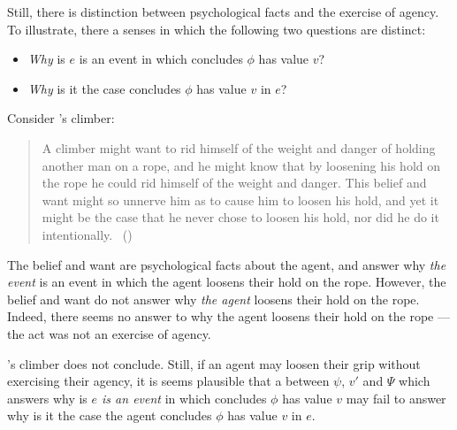 
\begin{note}
  Still, there is distinction between psychological facts and the exercise of agency.
  To illustrate, there a senses in which the following two questions are distinct:

  \begin{itemize}
  \item
    \emph{Why} is \(e\) is an event in which \vAgent{} concludes \(\phi\) has value \(v\)?
  \item
    \emph{Why} is it the case \vAgent{} concludes \(\phi\) has value \(v\) in \(e\)?
  \end{itemize}

  Consider \citeauthor{Davidson:1973vd}'s climber:

  \begin{quote}
    A climber might want to rid himself of the weight and danger of holding another man on a rope, and he might know that by loosening his hold on the rope he could rid himself of the weight and danger.
    This belief and want might so unnerve him as to cause him to loosen his hold, and yet it might be the case that he never chose to loosen his hold, nor did he do it intentionally.%
    \mbox{ }\hfill\mbox{(\citeauthor[79]{Davidson:1973vd})}
  \end{quote}

  The \agents{} belief and want are psychological facts about the agent, and answer why \emph{the event} is an event in which the agent loosens their hold on the rope.
  However, the \agents{} belief and want do not answer why \emph{the agent} loosens their hold on the rope.
  Indeed, there seems no answer to why the agent loosens their hold on the rope --- the act was not an exercise of agency.

  \citeauthor{Davidson:1973vd}'s climber does not conclude.
  Still, if an agent may loosen their grip without exercising their agency, it is seems plausible that a \ros{} between \(\psi\), \(v'\) and \(\Psi\) which answers why is \emph{\(e\) is an event} in which \vAgent{} concludes \(\phi\) has value \(v\) may fail to answer why is it the case the agent concludes \(\phi\) has value \(v\) in \(e\).


\end{note}
